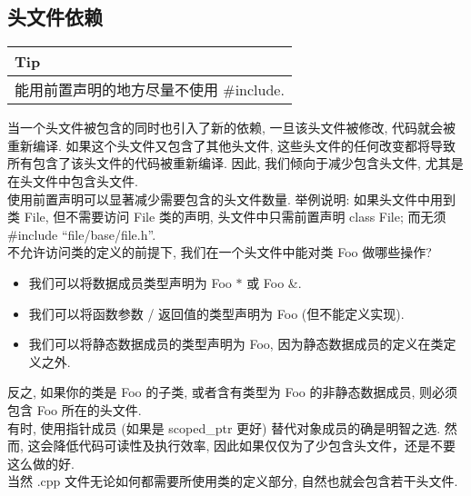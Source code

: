 \documentclass[a4paper,11pt,CJK]{article}
\begin{document}
\begin{CJK}{UTF8}{gbsn}
\subsection{头文件依赖}
\begin{table}[htbp]
\flushleft
\begin{tabular}{p{400pt}}
\toprule
\rowcolor[gray]{.8} Tip \\
\midrule
能用前置声明的地方尽量不使用 \#include. \\
\bottomrule
\end{tabular}
\end{table}
当一个头文件被包含的同时也引入了新的依赖, 一旦该头文件被修改, 代码就会被重新编译. 如果这个头文件又包含了其他头文件, 这些头文件的任何改变都将导致所有包含了该头文件的代码被重新编译. 因此, 我们倾向于减少包含头文件, 尤其是在头文件中包含头文件. \\
\indent 使用前置声明可以显著减少需要包含的头文件数量. 举例说明: 如果头文件中用到类 File, 但不需要访问 File 类的声明, 头文件中只需前置声明 class File; 而无须 \#include ``file/base/file.h''. \\
\indent 不允许访问类的定义的前提下, 我们在一个头文件中能对类 Foo 做哪些操作?
\begin{itemize}
    \item 我们可以将数据成员类型声明为 Foo $*$ 或 Foo \&.
    \item 我们可以将函数参数 / 返回值的类型声明为 Foo (但不能定义实现).
    \item 我们可以将静态数据成员的类型声明为 Foo, 因为静态数据成员的定义在类定义之外.
\end{itemize}
反之, 如果你的类是 Foo 的子类, 或者含有类型为 Foo 的非静态数据成员, 则必须包含 Foo 所在的头文件. \\
\indent 有时, 使用指针成员 (如果是 scoped\_ptr 更好) 替代对象成员的确是明智之选. 然而, 这会降低代码可读性及执行效率, 因此如果仅仅为了少包含头文件，还是不要这么做的好. \\
\indent 当然 .cpp 文件无论如何都需要所使用类的定义部分, 自然也就会包含若干头文件.


\end{CJK}
\end{document}
